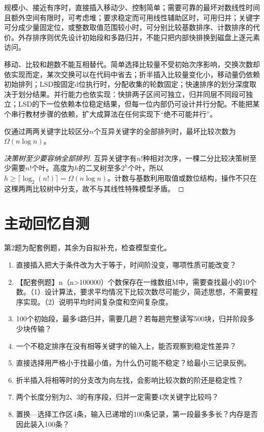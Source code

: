 规模小、接近有序时，直接插入移动少、控制简单；需要可靠的最坏对数线性时间且额外空间有限时，可考虑堆；要求稳定而可用线性辅助区时，可用归并；关键字可分成少量固定位，或整数取值范围较小时，可分别比较基数排序、计数排序的代价。外存排序则优先设计初始段和多路归并，不能只把内部快排换到磁盘上逐元素访问。

移动、比较和趟数不能互相替代。简单选择比较量不受初始次序影响，交换次数却依实现而定，某次交换可以在代码中省去；折半插入比较量变化小，移动量仍依赖初始排列；LSD按固定d位执行时，分配收集的轮数固定；快速排序的划分深度取决于划分结果。并行能力也依实现：快排两子区间可独立，归并同层不同段可独立；LSD的下一位依赖本位稳定结果，但每一位内部仍可设计并行分配。不能把某个串行教材步骤的依赖，扩大成算法在任何实现下``绝不可能并行''。

\begin{theorem}[比较排序下界的适用模型]

仅通过两两关键字比较区分\(n\)个互异关键字的全部排列时，最坏比较次数为\(\Omega(n\log n)\)。

\end{theorem}

\begin{proof}[决策树至少要容纳全部排列]

互异关键字有\(n!\)种相对次序，一棵二分比较决策树至少需要\(n!\)个叶。高度为\(h\)的二叉树至多\(2^h\)个叶，所以\(h\ge\lceil\log_2(n!)\rceil=\Omega(n\log n)\)。计数与基数利用取值或数位结构，操作不只在这棵两两比较树中分支，故不与其线性特殊模型矛盾。

\end{proof}

\section{主动回忆自测}\label{DS08-check}

第2题为配套例题，其余为自拟补充，检查模型变化。

\begin{enumerate}
\def\labelenumi{\arabic{enumi}.}
\item
  直接插入把大于条件改为大于等于，时间阶没变，哪项性质可能改变？
\item
  【配套例题】n（n\textgreater100000）个数保存在一维数组M中，需要查找最小的10个数。（1）设计算法，要求平均情况下比较次数尽可能少，简述思想，不需要程序实现。（2）说明平均时间复杂度和空间复杂度。
\item
  100个初始段，最多4路归并，需要几趟？若每趟完整读写500块，归并阶段多少块传输？
\item
  一个不稳定排序在没有相等关键字的输入上，能否观察到稳定性差异？
\item
  直接选择用严格小于找最小值，为什么仍可能不稳定？给最小三记录反例。
\item
  折半插入将相等时的分支改为向左找，会影响比较次数的阶还是稳定性？
\item
  两个长度分别为2、3的有序段，归并一定需要4次关键字比较吗？
\item
  置换---选择工作区4条，输入已递增的100条记录，第一段最多多长？内存是否因此装入100条？
\end{enumerate}

